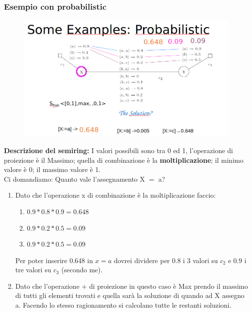 \subsubsection{Esempio con probabilistic}
\begin{figure}[htp]
    \centering
    \includegraphics[width=14cm, keepaspectratio]{img/Cap4/probabilistic2.png}
\end{figure}
\noindent \textbf{Descrizione del semiring:} I valori possibili sono tra 0 ed 1,
l'operazione di proiezione è il Massimo; quella di combinazione è la
\textbf{moltiplicazione}; il minimo valore è 0; il massimo valore è 1. \\Ci
domandiamo: Quanto vale l'assegnamento X $=$ a?
\begin{enumerate}
    \item Dato che l'operazione x di combinazione è la moltiplicazione faccio:
          \begin{enumerate}
              \item $0.9*0.8*0.9 = 0.648$
              \item $0.9*0.2*0.5 = 0.09$
              \item $0.9*0.2*0.5 = 0.09$
          \end{enumerate}
          Per poter inserire 0.648 in $x = a$ dovrei dividere per 0.8 i 3 valori
          su $c_2$ e 0.9 i tre valori su $c_3$ (secondo me).
    \item Dato che l'operazione + di proiezione in questo caso è Max prendo il
          massimo di tutti gli elementi trovati e quella sarà la soluzione di
          quando ad X assegno a. Facendo lo stesso ragionamento si calcolano
          tutte le restanti soluzioni.
\end{enumerate}

